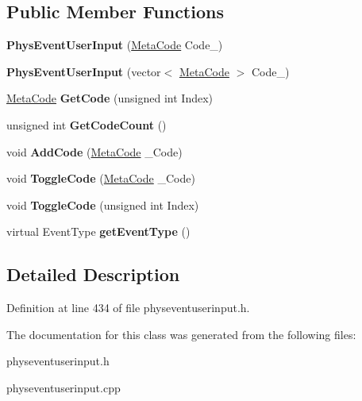 \subsection*{Public Member Functions}
\begin{DoxyCompactItemize}
\item 
\hypertarget{classPhysEventUserInput_a218bec21fe49efcba82f3480e2386968}{
{\bfseries PhysEventUserInput} (\hyperlink{classMetaCode}{MetaCode} Code\_\-)}
\label{dc/d0e/classPhysEventUserInput_a218bec21fe49efcba82f3480e2386968}

\item 
\hypertarget{classPhysEventUserInput_ab9451ee5b385a3c575922ec7cfa07747}{
{\bfseries PhysEventUserInput} (vector$<$ \hyperlink{classMetaCode}{MetaCode} $>$ Code\_\-)}
\label{dc/d0e/classPhysEventUserInput_ab9451ee5b385a3c575922ec7cfa07747}

\item 
\hypertarget{classPhysEventUserInput_a590b347fcd5db7a48fc460b1ed538e4f}{
\hyperlink{classMetaCode}{MetaCode} {\bfseries GetCode} (unsigned int Index)}
\label{dc/d0e/classPhysEventUserInput_a590b347fcd5db7a48fc460b1ed538e4f}

\item 
\hypertarget{classPhysEventUserInput_a8232572283b9dc85c96a2b28479123a8}{
unsigned int {\bfseries GetCodeCount} ()}
\label{dc/d0e/classPhysEventUserInput_a8232572283b9dc85c96a2b28479123a8}

\item 
\hypertarget{classPhysEventUserInput_a2b30cdf2aedb70940b85bb9e4665230f}{
void {\bfseries AddCode} (\hyperlink{classMetaCode}{MetaCode} \_\-Code)}
\label{dc/d0e/classPhysEventUserInput_a2b30cdf2aedb70940b85bb9e4665230f}

\item 
\hypertarget{classPhysEventUserInput_a4d95c43110ac7023c5da208c14db565f}{
void {\bfseries ToggleCode} (\hyperlink{classMetaCode}{MetaCode} \_\-Code)}
\label{dc/d0e/classPhysEventUserInput_a4d95c43110ac7023c5da208c14db565f}

\item 
\hypertarget{classPhysEventUserInput_a1bf30bbab980fd0beee52509bdb4a2ad}{
void {\bfseries ToggleCode} (unsigned int Index)}
\label{dc/d0e/classPhysEventUserInput_a1bf30bbab980fd0beee52509bdb4a2ad}

\item 
\hypertarget{classPhysEventUserInput_a7adabb15e8012a86c9da1910033eea4b}{
virtual EventType {\bfseries getEventType} ()}
\label{dc/d0e/classPhysEventUserInput_a7adabb15e8012a86c9da1910033eea4b}

\end{DoxyCompactItemize}


\subsection{Detailed Description}


Definition at line 434 of file physeventuserinput.h.

The documentation for this class was generated from the following files:\begin{DoxyCompactItemize}
\item 
physeventuserinput.h\item 
physeventuserinput.cpp\end{DoxyCompactItemize}
